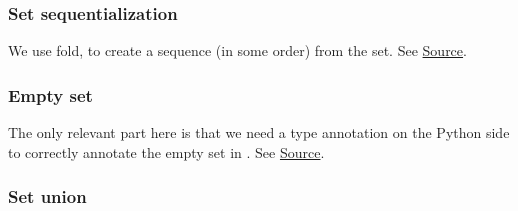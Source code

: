 \subsubsection{Set sequentialization}


\begin{mathpar}
\end{mathpar}

We use fold, to create a sequence (in some order) from the set.  See
\href{https://github.com/saltiniroberto/ssf/blob/7ea6e18093d9da3154b4e396dd435549f687e6b9/high_level/common/pythonic_code_generic.py#L23-L24}{Source}.

\subsubsection{ Empty set}


\begin{mathpar}
\end{mathpar}

The only relevant part here is that we need a type annotation on the Python
side to correctly annotate the empty set in \tlap{}.  See
\href{https://github.com/saltiniroberto/ssf/blob/7ea6e18093d9da3154b4e396dd435549f687e6b9/high_level/common/pythonic_code_generic.py#L27-L28}{Source}.

\subsubsection{ Set union}



